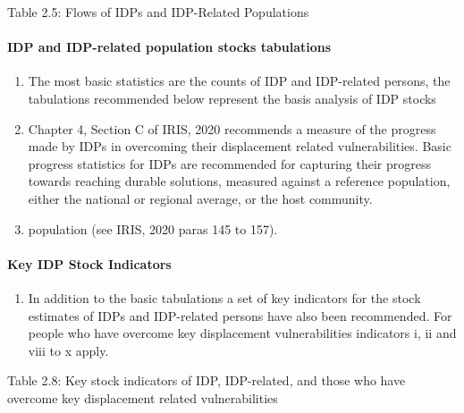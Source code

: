 \documentclass[
]{article}
\providecommand{\tightlist}{%
  \setlength{\itemsep}{0pt}\setlength{\parskip}{0pt}}
\begin{document}
Table 2.5: Flows of IDPs and IDP-Related Populations

\hypertarget{idp-and-idp-related-population-stocks-tabulations}{%
\paragraph{IDP and IDP-related population stocks tabulations}\label{idp-and-idp-related-population-stocks-tabulations}}

\begin{enumerate}
\def\labelenumi{\arabic{enumi}.}
\setcounter{enumi}{68}
\item
  The most basic statistics are the counts of IDP and IDP-related
  persons, the tabulations recommended below represent the basis
  analysis of IDP stocks
\item
  Chapter 4, Section C of IRIS, 2020 recommends a measure of the
  progress made by IDPs in overcoming their displacement related
  vulnerabilities. Basic progress statistics for IDPs are recommended
  for capturing their progress towards reaching durable solutions,
  measured against a reference population, either the national or
  regional average, or the host community.
\item
  population (see IRIS, 2020 paras 145 to 157).
\end{enumerate}

\hypertarget{section}{%
\paragraph{}\label{section}}

\hypertarget{key-idp-stock-indicators}{%
\paragraph{Key IDP Stock Indicators}\label{key-idp-stock-indicators}}

\begin{enumerate}
\def\labelenumi{\arabic{enumi}.}
\setcounter{enumi}{71}
\tightlist
\item
  In addition to the basic tabulations a set of key indicators for the
  stock estimates of IDPs and IDP-related persons have also been
  recommended. For people who have overcome key displacement
  vulnerabilities indicators i, ii and viii to x apply.
\end{enumerate}

Table 2.8: Key stock indicators of IDP, IDP-related, and those who have
overcome key displacement related vulnerabilities
\end{document}
